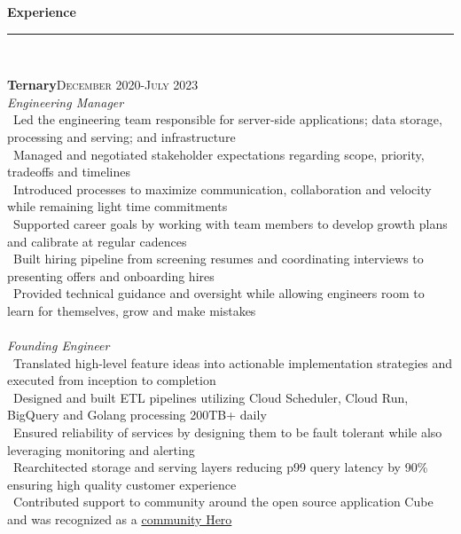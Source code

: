 \documentclass[a4paper,10pt]{article}
\newcommand{\horizontalline}{{\rule{533pt}{0.625pt}\\}}
\renewcommand{\section}[1]{{\noindent\textbf{\large #1}\\\horizontalline}}
\renewcommand{\subsection}[2]{{\noindent \textbf{#1}\hfill \textsc{#2}\\}}
\begin{document}
\par{ \par}
\par{ \par}
\bigskip
\bigskip

\section{Experience}
\subsection{Ternary}{December 2020-July 2023}
\textit{Engineering Manager}\\
\textbullet\ Led the engineering team responsible for server-side applications; data storage, processing and serving; and infrastructure\\
\textbullet\ Managed and negotiated stakeholder expectations regarding scope, priority, tradeoffs and timelines\\
\textbullet\ Introduced processes to maximize communication, collaboration and velocity while remaining light time commitments\\
\textbullet\ Supported career goals by working with team members to develop growth plans and calibrate at regular cadences\\
\textbullet\ Built hiring pipeline from screening resumes and coordinating interviews to presenting offers and onboarding hires\\
\textbullet\ Provided technical guidance and oversight while allowing engineers room to learn for themselves, grow and make mistakes\\ \\
\textit{Founding Engineer}\\
\textbullet\ Translated high-level feature ideas into actionable implementation strategies and executed from inception to completion\\
\textbullet\ Designed and built ETL pipelines utilizing Cloud Scheduler, Cloud Run, BigQuery and Golang processing 200TB+ daily\\
\textbullet\ Ensured reliability of services by designing them to be fault tolerant while also leveraging monitoring and alerting\\
\textbullet\ Rearchitected storage and serving layers reducing p99 query latency by 90\% ensuring high quality customer experience\\
\textbullet\ Contributed support to community around the open source application Cube and was recognized as a \href{https://cube.dev/community}{community Hero}\\
\end{document}

